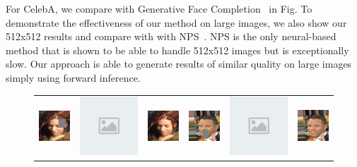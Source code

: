 For CelebA, we compare with Generative Face Completion~\cite{li2017generative} in Fig. To demonstrate the effectiveness of our method on large images, we also show our 512x512 results and compare with with NPS~\cite{yang2017high}. NPS is the only neural-based method that is shown to be able to handle 512x512 images but is exceptionally slow. Our approach is able to generate results of similar quality on large images simply using forward inference.

\begin{figure}[h!]
\centering
\small
\begin{tabular}{cccccc}
\includegraphics[width=.16\textwidth]{figures/face/000189_input_image.png}&
\includegraphics[width=.16\textwidth]{figures/placeh.png}&
\includegraphics[width=.16\textwidth]{figures/face/000189_synthesized_image.png}&
\includegraphics[width=.16\textwidth]{figures/face/000194_input_image.png}&
\includegraphics[width=.16\textwidth]{figures/placeh.png}&
\includegraphics[width=.16\textwidth]{figures/face/000194_synthesized_image.png}\\

\end{tabular}
\end{figure}
